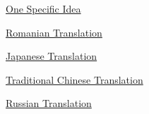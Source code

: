               
              
                \href{http://www.paulgraham.com/fixrazr.html}{One Specific Idea}


              
              
              
                
                  
                
              
              
              
                \href{http://ro.goobix.com/pg/ideas/}{Romanian Translation}


              
            
            
              
            
            
              
            
            
              
                
                  
                
              
              
              
                \href{http://blog.livedoor.jp/simoom634/archives/50642854.html}{Japanese Translation}


              
              
              
                
                  
                
              
              
              
                \href{http://www.csie.ntu.edu.tw/\textasciitilde{}p92005/paulgraham/ideas.html}{Traditional Chinese Translation}


              
            
            
              
            
            
              
            
            
              
                
                  
                
              
              
              
                \href{http://the-notebook.org/21/04/2006/idei-dlya-startapa/}{Russian Translation}


              
              
